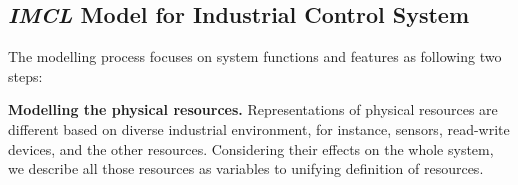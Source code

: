 \subsection{\emph{IMCL} Model for Industrial Control System}

The modelling process focuses on system functions and features as following two steps:
%
%

\medskip
\textbf{Modelling the physical resources. }
Representations of physical resources are different based on diverse industrial environment, for instance, sensors, read-write devices, and the other resources. Considering their effects on the whole system, we describe all those resources as variables to unifying definition of resources.

